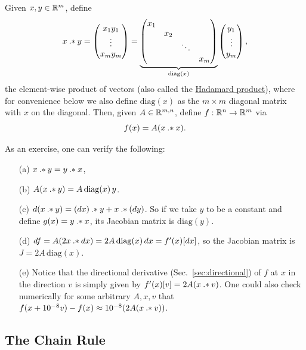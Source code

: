 \begin{example}
    Given $x,y\in \mathbb R^m$, define
    $$x\mathbin{.*} y = \begin{pmatrix}
        x_1y_1 \\ \vdots \\ x_my_m
    \end{pmatrix} = \underbrace{\begin{pmatrix} x_1 & & & \\ & x_2 & & \\ & & \ddots & \\ & & & x_m \end{pmatrix}}_{\mathrm{diag}(x)} \begin{pmatrix}
        y_1 \\ \vdots \\ y_m
    \end{pmatrix},$$
    the element-wise product of vectors (also called the \href{https://en.wikipedia.org/wiki/Hadamard_product_(matrices)}{Hadamard product}), where for convenience below we also define $\mathrm{diag}(x)$ as the $m \times m$ diagonal matrix with $x$ on the diagonal. Then, given $A \in \mathbb R^{m,n}$, define $f:\mathbb R^n \to \mathbb R^m$ via
    \[
    f(x) = A(x\mathbin{.*} x).
    \]

    As an exercise, one can verify the following:
    \begin{itemize}
        \item[(a)] $x\mathbin{.*} y = y\mathbin{.*} x$,
        \item[(b)] $A(x\mathbin{.*} y) = A \, \mathrm{diag}(x)\, y$.
        \item[(c)] $d(x\mathbin{.*} y) = (d x)\mathbin{.*} y + x\mathbin{.*}(d y)$.  So if we take $y$ to be a constant and define $g(x) = y \mathbin{.*} x$, its Jacobian matrix is $\mathrm{diag}(y)$.
        \item[(d)] $d f = A(2x\mathbin{.*} dx) = 2A \, \mathrm{diag}(x) \, dx = f'(x)[dx]$, so the Jacobian matrix is $J = 2A \, \mathrm{diag}(x)$.
        \item[(e)] Notice that the directional derivative (Sec.~\ref{sec:directional}) of $f$ at $x$ in the direction $v$ is simply given by $f'(x)[v] = 2A (x \mathbin{.*} v)$.   One could also check numerically for some arbitrary $A,x,v$ that $f(x + 10^{-8} v) - f(x) \approx 10^{-8} ( 2A (x \mathbin{.*} v))$.
    \end{itemize}
\end{example}

\subsection{The Chain Rule}
\label{sec:chainrule}


